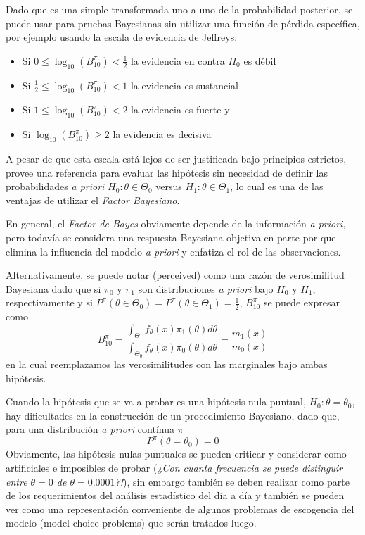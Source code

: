 \documentclass[12pt,]{article}
\providecommand{\tightlist}{%
  \setlength{\itemsep}{0pt}\setlength{\parskip}{0pt}}
\begin{document}
Dado que es una simple transformada uno a uno de la probabilidad
posterior, se puede usar para pruebas Bayesianas sin utilizar una
función de pérdida específica, por ejemplo usando la escala de evidencia
de Jeffreys:

\begin{itemize}
\tightlist
\item
  Si \(0\le\log_{10}(B_{10}^\pi)<\frac{1}{2}\) la evidencia en contra
  \(H_0\) es débil
\item
  Si \(\frac{1}{2}\le\log_{10}(B_{10}^\pi)<1\) la evidencia es
  sustancial
\item
  Si \(1\le\log_{10}(B_{10}^\pi)<2\) la evidencia es fuerte y
\item
  Si \(\log_{10}(B_{10}^\pi)\ge2\) la evidencia es decisiva
\end{itemize}

A pesar de que esta escala está lejos de ser justificada bajo principios
estrictos, provee una referencia para evaluar las hipótesis sin
necesidad de definir las probabilidades \emph{a priori}
\(H_0:\theta\in\Theta_0\) versus \(H_1:\theta\in\Theta_1\), lo cual es
una de las ventajas de utilizar el \emph{Factor Bayesiano}.

En general, el \emph{Factor de Bayes} obviamente depende de la
información \emph{a priori}, pero todavía se considera una respuesta
Bayesiana objetiva en parte por que elimina la influencia del modelo
\emph{a priori} y enfatiza el rol de las observaciones.

Alternativamente, se puede notar (perceived) como una razón de
verosimilitud Bayesiana dado que si \(\pi_0\) y \(\pi_1\) son
distribuciones \emph{a priori} bajo \(H_0\) y \(H_1\), respectivamente y
si \(P^\pi(\theta\in\Theta_0)=P^\pi(\theta\in\Theta_1)=\frac{1}{2}\),
\(B_{10}^\pi\) se puede expresar como \[
B_{10}^\pi=\frac{\displaystyle\int_{\Theta_1}f_\theta(x)\pi_1(\theta)d\theta}{\displaystyle\int_{\Theta_0}f_\theta(x)\pi_0(\theta)d\theta}=\frac{m_1(x)}{m_0(x)}
\] en la cual reemplazamos las verosimilitudes con las marginales bajo
ambas hipótesis.

Cuando la hipótesis que se va a probar es una hipótesis nula puntual,
\(H_0:\theta=\theta_0\), hay dificultades en la construcción de un
procedimiento Bayesiano, dado que, para una distribución \emph{a priori}
contínua \(\pi\) \[
P^\pi(\theta=\theta_0)=0
\] Obviamente, las hipótesis nulas puntuales se pueden criticar y
considerar como artificiales e imposibles de probar (\emph{¿Con cuanta
frecuencia se puede distinguir entre \(\theta=0\) de
\(\theta=0.0001\)?!}), sin embargo también se deben realizar como parte
de los requerimientos del análisis estadístico del día a día y también
se pueden ver como una representación conveniente de algunos problemas
de escogencia del modelo (model choice problems) que serán tratados
luego.
\end{document}
